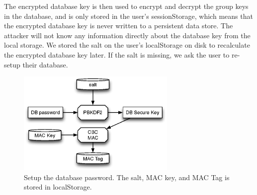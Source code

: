 The encrypted database key is then used to encrypt and decrypt the group keys in the database, and is only stored in the user's sessionStorage, which means that the encrypted database key is never written to a persistent data store. The attacker will not know any information directly about the database key from the local storage. We stored the salt on the user's localStorage on disk to recalculate the encrypted database key later. If the salt is missing, we ask the user to re-setup their database. 

\begin{figure}[h!]
\centering
\caption{Setup the database password. The salt, MAC key, and MAC Tag is stored in localStorage.}
\label{fig:dbkeys}
\includegraphics[height=5cm]{fig/dbkeys.eps}
\end{figure}

